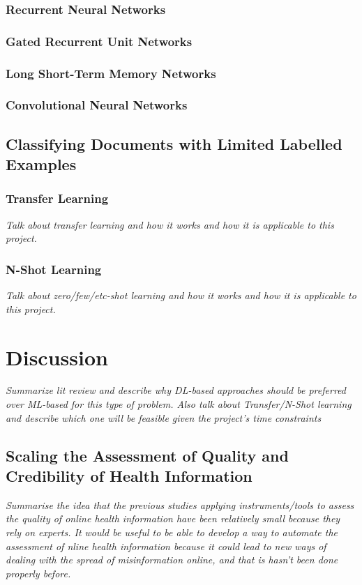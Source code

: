 \documentclass[a4paper,twoside,phd]{BYUPhys}
\begin{document}
\subsubsection{Recurrent Neural Networks}
\label{sec:RNN}

\subsubsection{Gated Recurrent Unit Networks}
\label{sec:GRU}

\subsubsection{Long Short-Term Memory Networks}
\label{sec:LSTM}

\subsubsection{Convolutional Neural Networks}
\label{sec:CNN}


\subsection{Classifying Documents with Limited Labelled Examples}
\label{sec:TransferLearning}

\subsubsection{Transfer Learning}
\label{sec:TransferLearningReview}
\textit{Talk about transfer learning and how it works and how it is applicable to this project.}

\subsubsection{N-Shot Learning}
\label{sec:NShotLearningReview}
\textit{Talk about zero/few/etc-shot learning and how it works and how it is applicable to this project.}

\section{Discussion}
\label{sec:LitReviewDiscussion}
\textit{Summarize lit review and describe why DL-based approaches should be preferred over ML-based for this type of problem. Also talk about Transfer/N-Shot learning and describe which one will be feasible given the project's time constraints}

\subsection{Scaling the Assessment of Quality and Credibility of Health Information}
\label{sec:ScalingAssessment}
\textit{Summarise the idea that the previous studies applying instruments/tools to assess the quality of online health information have been relatively small because they rely on experts. It would be useful to be able to develop a way to  automate the assessment of nline health information because it could lead to new ways of dealing with the spread of misinformation online, and that is hasn't been done properly before.}
\end{document}
